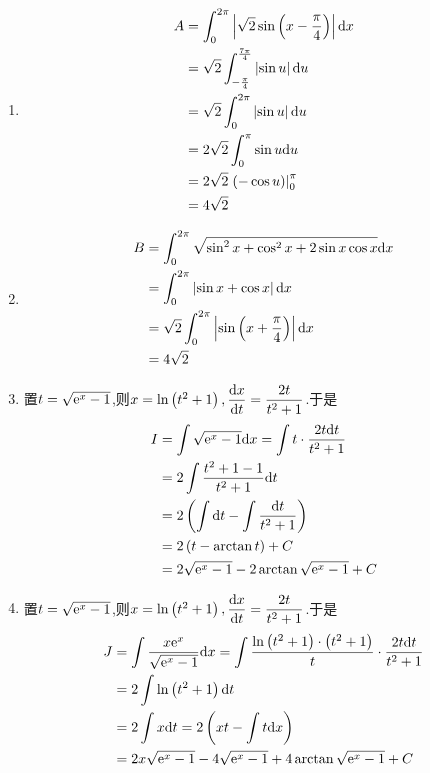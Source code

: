 \documentclass{ctexart}
\begin{document}
\begin{solution}
    \begin{enumerate}[label=\textbf{(\arabic*)}]
        \item $$\begin{aligned}
                A
                &= \int_{0}^{2\pi}\left|\sqrt{2}\sin\left(x-\dfrac{\pi}{4}\right)\right|\mathrm{d} x \\
                &= \sqrt{2}\int_{-\frac{\pi}{4}}^{\frac{7\pi}{4}}\left|\sin u\right|\mathrm{d} u \\
                &= \sqrt{2}\int_{0}^{2\pi}\left|\sin u\right|\mathrm{d} u\\
                &= 2\sqrt{2}\int_{0}^{\pi}\sin u\mathrm{d} u \\
                &= 2\sqrt{2}\left.\left(-\cos u\right)\right|_{0}^{\pi} \\
                &= 4\sqrt{2}
            \end{aligned}$$
        \item $$\begin{aligned}
                B
                &= \int_{0}^{2\pi}\sqrt{\sin^2x+\cos^2x+2\sin x\cos x}\mathrm{d} x \\
                &= \int_{0}^{2\pi}\left|\sin x+\cos x\right|\mathrm{d} x \\
                &= \sqrt{2}\int_0^{2\pi}\left|\sin\left(x+\dfrac{\pi}{4}\right)\right|\mathrm{d} x \\
                &= 4\sqrt{2}
            \end{aligned}$$
        \item 置$t=\sqrt{\mathrm{e}^x-1}$,则$x=\ln\left(t^2+1\right),\dfrac{\mathrm{d} x}{\mathrm{d} t}=\dfrac{2t}{t^2+1}$.于是
            $$\begin{aligned}
                I
                &= \int\sqrt{\mathrm{e}^x-1}\mathrm{d} x=\int t\cdot\dfrac{2t\mathrm{d} t}{t^2+1} \\
                &= 2\int\dfrac{t^2+1-1}{t^2+1}\mathrm{d} t \\
                &= 2\left(\int\mathrm{d} t-\int\dfrac{\mathrm{d} t}{t^2+1}\right) \\
                &= 2\left(t-\arctan t\right)+C \\
                &= 2\sqrt{\mathrm{e}^x-1}-2\arctan\sqrt{\mathrm{e}^x-1}+C
            \end{aligned}$$
        \item 置$t=\sqrt{\mathrm{e}^x-1}$,则$x=\ln\left(t^2+1\right),\dfrac{\mathrm{d} x}{\mathrm{d} t}=\dfrac{2t}{t^2+1}$.于是
            $$\begin{aligned}
                J
                &= \int\dfrac{x\mathrm{e}^x}{\sqrt{\mathrm{e}^x-1}}\mathrm{d} x =\int\dfrac{\ln\left(t^2+1\right)\cdot\left(t^2+1\right)}{t}\cdot\dfrac{2t\mathrm{d} t}{t^2+1} \\
                &= 2\int\ln\left(t^2+1\right)\mathrm{d} t\\
                &= 2\int x\mathrm{d} t=2\left(xt-\int t\mathrm{d} x\right) \\
                &= 2x\sqrt{\mathrm{e}^x-1}-4\sqrt{\mathrm{e}^x-1}+4\arctan\sqrt{\mathrm{e}^x-1}+C
            \end{aligned}$$
    \end{enumerate}
\end{solution}
\end{document}
